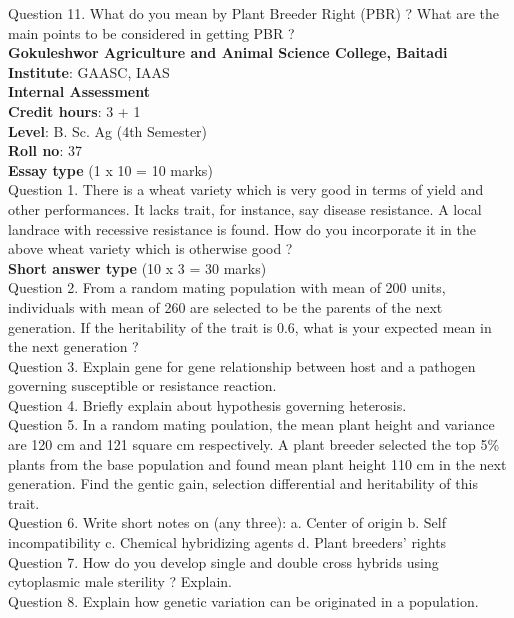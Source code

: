 \documentclass[12pt]{article}\usepackage[]{graphicx}\usepackage[]{color}
\begin{document}
Question 11. What do you mean by Plant Breeder Right (PBR) ? What are the main points to be considered in getting PBR ?\\
\clearpage 
{\centering \Large{\textbf{Gokuleshwor Agriculture and Animal Science College, Baitadi}} \\[0.25cm]
            \textbf{Institute}: GAASC, IAAS \\[0.2cm]
            \textbf{Internal Assessment} \\[0.2cm]} 
\textbf{Credit hours}: 3 + 1 \\ 
\textbf{Level}: B. Sc. Ag (4th Semester) \\
\textbf{Roll no}: 37 \\[0.5cm] 
\textbf{Essay type} (1 x 10 = 10 marks) \\
Question 1. There is a wheat variety which is very good in terms of yield and other performances. It lacks trait, for instance, say disease resistance. A local landrace with recessive resistance is found. How do you incorporate it in the above wheat variety which is otherwise good ?\\
\textbf{Short answer type} (10 x 3 = 30 marks) \\
Question 2. From a random mating population with mean of 200 units, individuals with mean of 260 are selected to be the parents of the next generation. If the heritability of the trait is 0.6, what is your expected mean in the next generation ?\\
Question 3. Explain gene for gene relationship between host and a pathogen governing susceptible or resistance reaction.\\
Question 4. Briefly explain about hypothesis governing heterosis.\\
Question 5. In a random mating poulation, the mean plant height and variance are 120 cm and 121 square cm respectively. A plant breeder selected the top 5\% plants from the base population and found mean plant height 110 cm in the next generation. Find the gentic gain, selection differential and heritability of this trait.\\
Question 6. Write short notes on (any three): a. Center of origin b. Self incompatibility c. Chemical hybridizing agents d. Plant breeders' rights\\
Question 7. How do you develop single and double cross hybrids using cytoplasmic male sterility ? Explain.\\
Question 8. Explain how genetic variation can be originated in a population.\\
\end{document}
